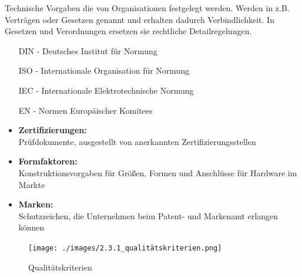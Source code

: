     \begin{tcolorbox}[width=11cm, center, title=Normen, coltitle=white, colframe=orange, colback=white!60!orange]
        Technische Vorgaben die von Organisationen festgelegt werden. Werden in z.B. Verträgen oder Gesetzen genannt und erhalten dadurch Verbindlichkeit.
        In Gesetzen und Verordnungen ersetzen sie rechtliche Detailregelungen.
    \end{tcolorbox}

    \begin{tcolorbox}[width=10cm, center, title=Abkürzungen, coltitle=white, colframe=white!20!blue, colback=white!80!blue]
        \begin{itemize}[itemsep=0.01em, parsep=0.3em]
            \item[DIN -] Deutsches Institut für Normung
            \item[ISO -] Internationale Organisation für Normung
            \item[IEC -] Internationale Elektrotechnische Normung
            \item[EN -] Normen Europäischer Komitees 
        \end{itemize}
    \end{tcolorbox}

    \begin{subindent}
        \begin{itemize}[leftmargin=2.5cm, topsep=0.3em, itemsep=0.1em, parsep=0.5em]
            \item \textbf{Zertifizierungen:} \\ Prüfdokumente, ausgestellt von anerkannten Zertifizierungsstellen
            \item \textbf{Formfaktoren:} \\ Konstruktionsvorgaben für Größen, Formen und Anschlüsse für Hardware im Markte
            \item \textbf{Marken:} \\ Schutzzeichen, die Unternehmen beim Patent- und Markenamt erlangen können   
        \end{itemize}
    \end{subindent}

    \begin{figure}[ht]
        \centering
        \texttt{[image: ./images/2.3.1\_qualitätskriterien.png]}
        \caption{Qualitätskriterien}\label{fig:Qualitätskriterien}
    \end{figure}

\newpage
